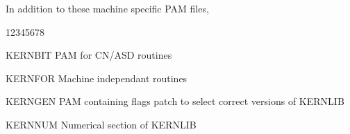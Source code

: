 In addition to these machine specific PAM files,

\begin{DLtt}{12345678}
\item[KERNBIT]   PAM for CN/ASD routines
\item[KERNFOR]   Machine independant routines
\item[KERNGEN]   PAM containing flags patch to select correct versions of KERNLIB
\item[KERNNUM]   Numerical section of KERNLIB
\end{DLtt}

